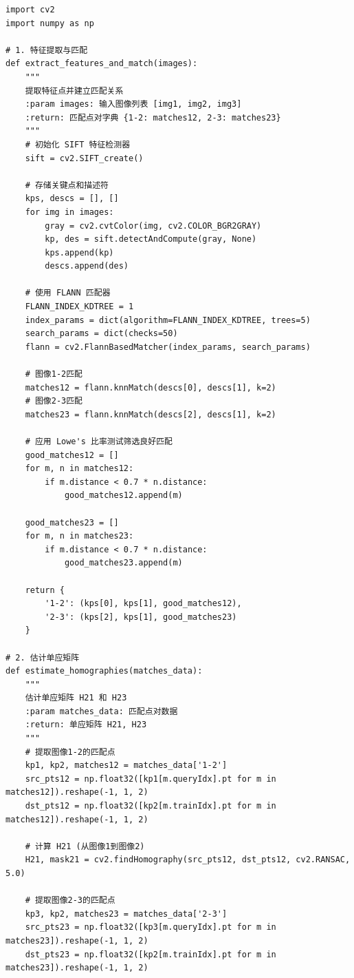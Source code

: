 \documentclass{article}
\begin{document}
\begin{lstlisting}
import cv2
import numpy as np

# 1. 特征提取与匹配
def extract_features_and_match(images):
    """
    提取特征点并建立匹配关系
    :param images: 输入图像列表 [img1, img2, img3]
    :return: 匹配点对字典 {1-2: matches12, 2-3: matches23}
    """
    # 初始化 SIFT 特征检测器
    sift = cv2.SIFT_create()
    
    # 存储关键点和描述符
    kps, descs = [], []
    for img in images:
        gray = cv2.cvtColor(img, cv2.COLOR_BGR2GRAY)
        kp, des = sift.detectAndCompute(gray, None)
        kps.append(kp)
        descs.append(des)
    
    # 使用 FLANN 匹配器
    FLANN_INDEX_KDTREE = 1
    index_params = dict(algorithm=FLANN_INDEX_KDTREE, trees=5)
    search_params = dict(checks=50)
    flann = cv2.FlannBasedMatcher(index_params, search_params)
    
    # 图像1-2匹配
    matches12 = flann.knnMatch(descs[0], descs[1], k=2)
    # 图像2-3匹配
    matches23 = flann.knnMatch(descs[2], descs[1], k=2)
    
    # 应用 Lowe's 比率测试筛选良好匹配
    good_matches12 = []
    for m, n in matches12:
        if m.distance < 0.7 * n.distance:
            good_matches12.append(m)
    
    good_matches23 = []
    for m, n in matches23:
        if m.distance < 0.7 * n.distance:
            good_matches23.append(m)
    
    return {
        '1-2': (kps[0], kps[1], good_matches12),
        '2-3': (kps[2], kps[1], good_matches23)
    }

# 2. 估计单应矩阵
def estimate_homographies(matches_data):
    """
    估计单应矩阵 H21 和 H23
    :param matches_data: 匹配点对数据
    :return: 单应矩阵 H21, H23
    """
    # 提取图像1-2的匹配点
    kp1, kp2, matches12 = matches_data['1-2']
    src_pts12 = np.float32([kp1[m.queryIdx].pt for m in matches12]).reshape(-1, 1, 2)
    dst_pts12 = np.float32([kp2[m.trainIdx].pt for m in matches12]).reshape(-1, 1, 2)
    
    # 计算 H21 (从图像1到图像2)
    H21, mask21 = cv2.findHomography(src_pts12, dst_pts12, cv2.RANSAC, 5.0)
    
    # 提取图像2-3的匹配点
    kp3, kp2, matches23 = matches_data['2-3']
    src_pts23 = np.float32([kp3[m.queryIdx].pt for m in matches23]).reshape(-1, 1, 2)
    dst_pts23 = np.float32([kp2[m.trainIdx].pt for m in matches23]).reshape(-1, 1, 2)
    

\end{lstlisting}
\end{document}
